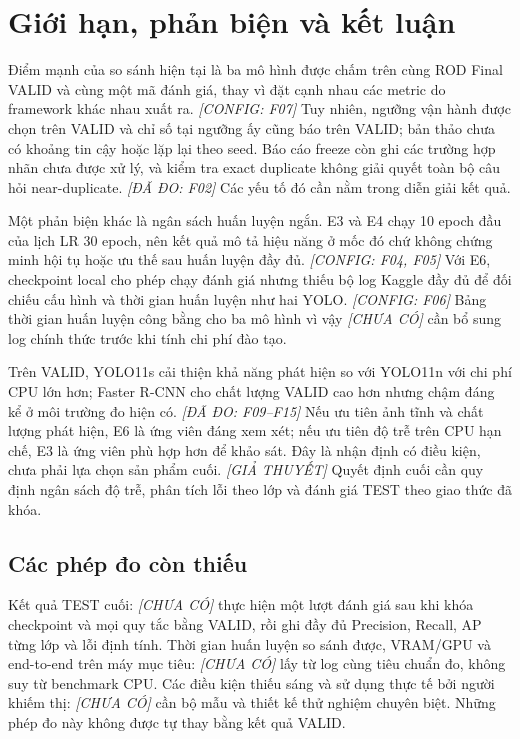 \documentclass[12pt,a4paper,oneside]{report}
\newcommand{\measured}[1]{\textit{[ĐÃ ĐO: #1]}}
\newcommand{\configured}[1]{\textit{[CONFIG: #1]}}
\newcommand{\hypothesis}{\textit{[GIẢ THUYẾT]}}
\newcommand{\missing}{\textit{[CHƯA CÓ]}}
\begin{document}

\chapter{Giới hạn, phản biện và kết luận}\label{chap:conclusion}
Điểm mạnh của so sánh hiện tại là ba mô hình được chấm trên cùng ROD Final VALID và cùng một mã đánh giá, thay vì đặt cạnh nhau các metric do framework khác nhau xuất ra. \configured{F07} Tuy nhiên, ngưỡng vận hành được chọn trên VALID và chỉ số tại ngưỡng ấy cũng báo trên VALID; bản thảo chưa có khoảng tin cậy hoặc lặp lại theo seed. Báo cáo freeze còn ghi các trường hợp nhãn chưa được xử lý, và kiểm tra exact duplicate không giải quyết toàn bộ câu hỏi near-duplicate. \measured{F02} Các yếu tố đó cần nằm trong diễn giải kết quả.

Một phản biện khác là ngân sách huấn luyện ngắn. E3 và E4 chạy 10 epoch đầu của lịch LR 30 epoch, nên kết quả mô tả hiệu năng ở mốc đó chứ không chứng minh hội tụ hoặc ưu thế sau huấn luyện đầy đủ. \configured{F04, F05} Với E6, checkpoint local cho phép chạy đánh giá nhưng thiếu bộ log Kaggle đầy đủ để đối chiếu cấu hình và thời gian huấn luyện như hai YOLO. \configured{F06} Bảng thời gian huấn luyện công bằng cho ba mô hình vì vậy \missing\; cần bổ sung log chính thức trước khi tính chi phí đào tạo.

Trên VALID, YOLO11s cải thiện khả năng phát hiện so với YOLO11n với chi phí CPU lớn hơn; Faster R-CNN cho chất lượng VALID cao hơn nhưng chậm đáng kể ở môi trường đo hiện có. \measured{F09--F15} Nếu ưu tiên ảnh tĩnh và chất lượng phát hiện, E6 là ứng viên đáng xem xét; nếu ưu tiên độ trễ trên CPU hạn chế, E3 là ứng viên phù hợp hơn để khảo sát. Đây là nhận định có điều kiện, chưa phải lựa chọn sản phẩm cuối. \hypothesis\; Quyết định cuối cần quy định ngân sách độ trễ, phân tích lỗi theo lớp và đánh giá TEST theo giao thức đã khóa.

\section*{Các phép đo còn thiếu}
Kết quả TEST cuối: \missing\; thực hiện một lượt đánh giá sau khi khóa checkpoint và mọi quy tắc bằng VALID, rồi ghi đầy đủ Precision, Recall, AP từng lớp và lỗi định tính. Thời gian huấn luyện so sánh được, VRAM/GPU và end-to-end trên máy mục tiêu: \missing\; lấy từ log cùng tiêu chuẩn đo, không suy từ benchmark CPU. Các điều kiện thiếu sáng và sử dụng thực tế bởi người khiếm thị: \missing\; cần bộ mẫu và thiết kế thử nghiệm chuyên biệt. Những phép đo này không được tự thay bằng kết quả VALID.
\end{document}
